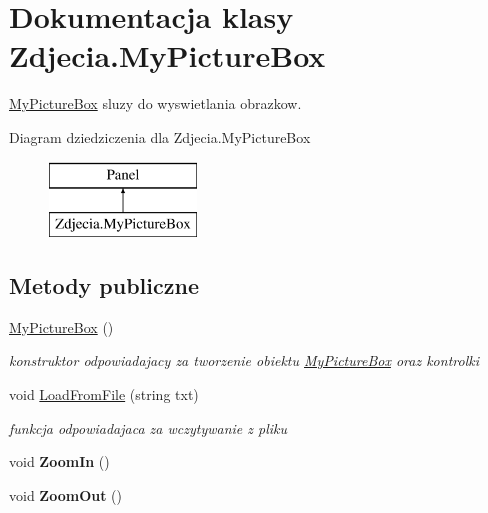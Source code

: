 \hypertarget{class_zdjecia_1_1_my_picture_box}{}\section{Dokumentacja klasy Zdjecia.\+My\+Picture\+Box}
\label{class_zdjecia_1_1_my_picture_box}


\hyperlink{class_zdjecia_1_1_my_picture_box}{My\+Picture\+Box} sluzy do wyswietlania obrazkow.  


Diagram dziedziczenia dla Zdjecia.\+My\+Picture\+Box\begin{figure}[H]
\begin{center}
\leavevmode
\includegraphics[height=2.000000cm]{class_zdjecia_1_1_my_picture_box}
\end{center}
\end{figure}
\subsection*{Metody publiczne}
\begin{DoxyCompactItemize}
\item 
\hyperlink{class_zdjecia_1_1_my_picture_box_a90cd7b95014724ea93c1cecb0f959c8f}{My\+Picture\+Box} ()\hypertarget{class_zdjecia_1_1_my_picture_box_a90cd7b95014724ea93c1cecb0f959c8f}{}\label{class_zdjecia_1_1_my_picture_box_a90cd7b95014724ea93c1cecb0f959c8f}

\begin{DoxyCompactList}\small\item\em konstruktor odpowiadajacy za tworzenie obiektu \hyperlink{class_zdjecia_1_1_my_picture_box}{My\+Picture\+Box} oraz kontrolki \end{DoxyCompactList}\item 
void \hyperlink{class_zdjecia_1_1_my_picture_box_ae82545a339de3030575a0d72b3bb3def}{Load\+From\+File} (string txt)\hypertarget{class_zdjecia_1_1_my_picture_box_ae82545a339de3030575a0d72b3bb3def}{}\label{class_zdjecia_1_1_my_picture_box_ae82545a339de3030575a0d72b3bb3def}

\begin{DoxyCompactList}\small\item\em funkcja odpowiadajaca za wczytywanie z pliku \end{DoxyCompactList}\item 
void {\bfseries Zoom\+In} ()\hypertarget{class_zdjecia_1_1_my_picture_box_a06be7eb1a2f5ff281adcec73eb7adcbc}{}\label{class_zdjecia_1_1_my_picture_box_a06be7eb1a2f5ff281adcec73eb7adcbc}

\item 
void {\bfseries Zoom\+Out} ()\hypertarget{class_zdjecia_1_1_my_picture_box_a0c974a3a80623937181407146427db00}{}\label{class_zdjecia_1_1_my_picture_box_a0c974a3a80623937181407146427db00}

\end{DoxyCompactItemize}


